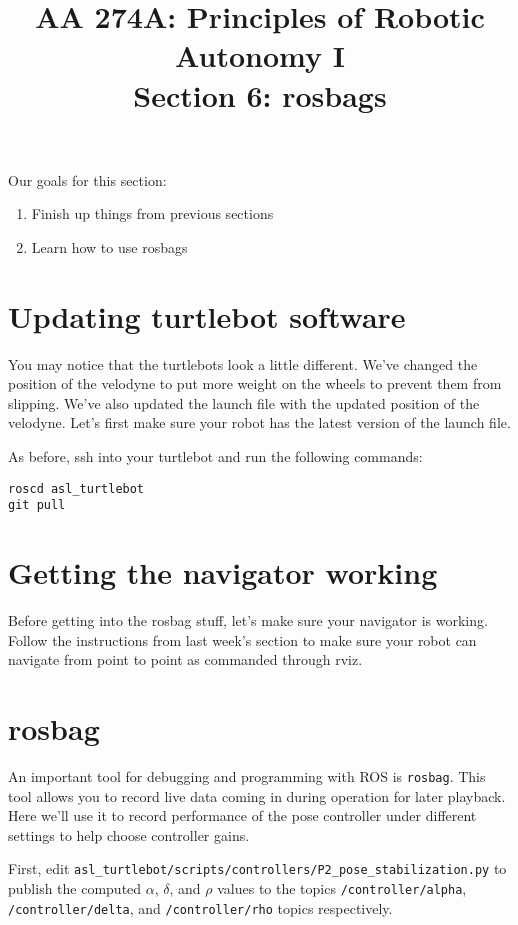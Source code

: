 \documentclass{article}
\title{AA 274A: Principles of Robotic Autonomy I \\Section 6: rosbags}
\date{}
\begin{document}
\maketitle
\pagestyle{fancy}
\vspace{-1.25cm}
Our goals for this section: 
\begin{enumerate}
    \item Finish up things from previous sections
    \item Learn how to use rosbags
\end{enumerate}

\section{Updating turtlebot software}
You may notice that the turtlebots look a little different. We've changed the position of the velodyne to put more weight on the wheels to prevent them from slipping. We've also updated the launch file with the updated position of the velodyne. Let's first make sure your robot has the latest version of the launch file.

As before, ssh into your turtlebot and run the following commands:
\begin{verbatim}
roscd asl_turtlebot
git pull
\end{verbatim}

\section{Getting the navigator working}
Before getting into the rosbag stuff, let's make sure your navigator is working. Follow the instructions from last week's section to make sure your robot can navigate from point to point as commanded through rviz.

\section{rosbag}
An important tool for debugging and programming with ROS is \texttt{rosbag}. This tool allows you to record live data coming in during operation for later playback. Here we'll use it to record performance of the pose controller under different settings to help choose controller gains.

First, edit \texttt{asl\_turtlebot/scripts/controllers/P2\_pose\_stabilization.py} to publish the computed $\alpha$, $\delta$, and $\rho$ values to the topics \texttt{/controller/alpha}, \texttt{/controller/delta}, and \texttt{/controller/rho} topics respectively. 
\end{document}

